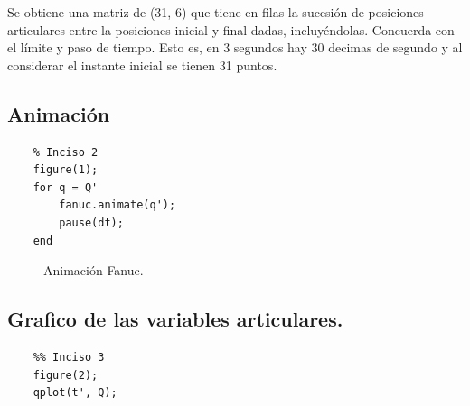 \documentclass[a4paper,12pt]{article}
\begin{document}
Se obtiene una matriz de (31, 6) que tiene en filas
la sucesión de posiciones articulares entre la posiciones inicial
y final dadas, incluyéndolas.
Concuerda con el límite y paso de tiempo. Esto es, en 3 segundos
hay 30 decimas de segundo y al considerar el instante inicial se tienen 31 puntos.

\subsection{Animación}
\begin{lstlisting}
    % Inciso 2
    figure(1);
    for q = Q'
        fanuc.animate(q');
        pause(dt);
    end
\end{lstlisting}

\begin{figure}[H]
    \centering
    \begin{adjustbox}{scale = 0.65, max width=\columnwidth}
    \end{adjustbox}
    \caption{Animación Fanuc.}
\end{figure}

\subsection{Grafico de las variables articulares.}
\begin{lstlisting}
    %% Inciso 3
    figure(2);
    qplot(t', Q);
\end{lstlisting}
\end{document}
